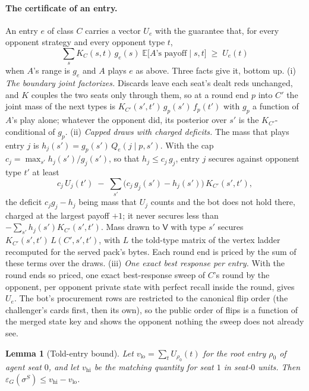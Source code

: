 \documentclass[11pt]{article}
\theoremstyle{plain}
\newtheorem{lemma}[theorem]{Lemma}
\theoremstyle{definition}
\theoremstyle{remark}
\newcommand{\game}{\ensuremath{G}}
\newcommand{\epsG}{\ensuremath{\varepsilon_{\game}}}
\begin{document}
\paragraph{The certificate of an entry.} An entry $e$ of class $C$
carries a vector $U_e$ with the guarantee that, for every opponent
strategy and every opponent type $t$,
\[
\sum_s K_C(s,t)\,g_e(s)\;\mathbb{E}\big[\text{$A$'s payoff}\mid s,t\big]\;\ge\;U_e(t)
\]
when $A$'s range is $g_e$ and $A$ plays $e$ as above. Three facts give
it, bottom up. (i) \emph{The boundary joint factorizes.} Discards
leave each seat's dealt reds unchanged, and $K$ couples the two seats
only through them, so at a round end $p$ into $C'$ the joint mass of
the next types is $K_{C'}(s',t')\,g_p(s')\,f_p(t')$ with $g_p$ a
function of $A$'s play alone; whatever the opponent did, its posterior
over $s'$ is the $K_{C'}$-conditional of $g_p$. (ii) \emph{Capped draws
with charged deficits.} The mass that plays entry $j$ is
$h_j(s')=g_p(s')\,Q_e(j\mid p,s')$. With the cap
$c_j=\max_{s'}h_j(s')/g_j(s')$, so that $h_j\le c_j\,g_j$, entry $j$
secures against opponent type $t'$ at least
\[
c_j\,U_j(t')\;-\;\sum_{s'}\big(c_j\,g_j(s')-h_j(s')\big)\,K_{C'}(s',t'),
\]
the deficit $c_jg_j-h_j$ being mass that $U_j$ counts and the bot does
not hold there, charged at the largest payoff $+1$; it never secures
less than $-\sum_{s'}h_j(s')K_{C'}(s',t')$. Mass drawn to $\mathsf{V}$
with type $s'$ secures $K_{C'}(s',t')\,L(C',s',t')$, with $L$ the
told-type matrix of the vertex ladder recomputed for the served pack's
bytes. Each round end is priced by the sum of these terms over the
draws. (iii) \emph{One exact best response per entry.} With the round
ends so priced, one exact best-response sweep of $C$'s round by the
opponent, per opponent private state with perfect recall inside the
round, gives $U_e$. The bot's procurement rows are restricted to the
canonical flip order (the challenger's cards first, then its own), so
the public order of flips is a function of the merged state key and
shows the opponent nothing the sweep does not already see.

\begin{lemma}[Told-entry bound]\label{lem:toldentry}
Let $v_{\mathrm{lo}}=\sum_t U_{\rho_0}(t)$ for the root entry $\rho_0$
of agent seat $0$, and let $v_{\mathrm{hi}}$ be the matching quantity
for seat $1$ in seat-$0$ units. Then
$\epsG(\sigma^{S})\le v_{\mathrm{hi}}-v_{\mathrm{lo}}$.
\end{lemma}
\end{document}
